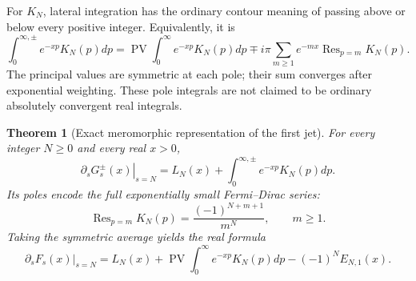 \documentclass[11pt,a4paper]{article}
\numberwithin{equation}{section}
\newtheorem{theorem}{Theorem}[section]
\theoremstyle{definition}
\theoremstyle{remark}
\begin{document}
For $K_N$, lateral integration has the ordinary contour meaning of
passing above or below every positive integer. Equivalently, it is
\begin{equation}\label{eq:borel-lateral-poles}
 \int_{0}^{\infty,\pm}e^{-xp}K_N(p)dp
 =\operatorname{PV}\int_0^\infty e^{-xp}K_N(p)dp
 \mp i\pi\sum_{m\geq1}e^{-mx}\operatorname{Res}_{p=m}K_N(p).
\end{equation}
The principal values are symmetric at each pole; their sum converges
after exponential weighting. These pole integrals are not claimed to be
ordinary absolutely convergent real integrals.

\begin{theorem}[Exact meromorphic representation of the first jet]
\label{thm:borel-meromorphic-jet}
For every integer $N\geq0$ and every real $x>0$,
\begin{equation}\label{eq:borel-JN-kernel}
 \boxed{\quad
 \left.\partial_sG_s^{\pm}(x)\right|_{s=N}
 =L_N(x)+\int_0^{\infty,\pm}e^{-xp}K_N(p)dp.\quad}
\end{equation}
Its poles encode the full exponentially small Fermi--Dirac series:
\begin{equation}\label{eq:borel-KN-res}
 \operatorname{Res}_{p=m}K_N(p)
 =\frac{(-1)^{N+m+1}}{m^N},\qquad m\geq1.
\end{equation}
Taking the symmetric average yields the real formula
\begin{equation}\label{eq:borel-real-order-jet}
 \left.\partial_sF_s(x)\right|_{s=N}
 =L_N(x)+\operatorname{PV}\int_0^\infty e^{-xp}K_N(p)dp
   -(-1)^NE_{N,1}(x).
\end{equation}
\end{theorem}
\end{document}
